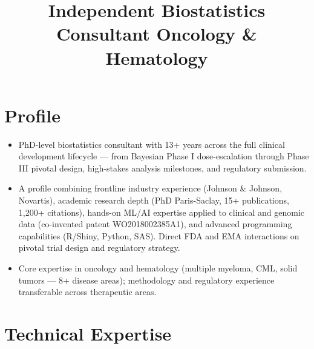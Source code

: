 \documentclass[11pt,a4paper]{moderncv}
\title{Independent Biostatistics Consultant \textbar{} Oncology \& Hematology}
\begin{document}
\makecvtitle

\section{Profile}

\begin{itemize}
  \item PhD-level biostatistics consultant with 13+ years across the full clinical development lifecycle --- from Bayesian Phase I dose-escalation through Phase III pivotal design, high-stakes analysis milestones, and regulatory submission.
  \item A profile combining frontline industry experience (Johnson \& Johnson, Novartis), academic research depth (PhD Paris-Saclay, 15+ publications, 1,200+ citations), hands-on ML/AI expertise applied to clinical and genomic data (co-invented patent WO2018002385A1), and advanced programming capabilities (R/Shiny, Python, SAS). Direct FDA and EMA interactions on pivotal trial design and regulatory strategy.
  \item Core expertise in oncology and hematology (multiple myeloma, CML, solid tumors --- 8+ disease areas); methodology and regulatory experience transferable across therapeutic areas.
\end{itemize}

\section{Technical Expertise}
\end{document}
